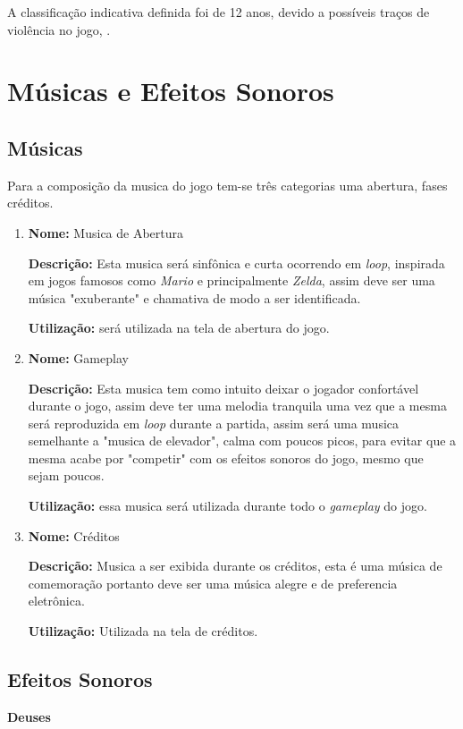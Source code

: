 \documentclass[11pt]{article} %
\begin{document}
A classificação indicativa definida foi de 12 anos, devido a possíveis traços de violência no jogo, . 


\newpage

\section{Músicas e Efeitos Sonoros}
\subsection{Músicas}
Para a composição da musica do jogo tem-se três categorias uma abertura, fases créditos. 

\begin{enumerate}
\item 
\textbf{Nome:} Musica de Abertura

\textbf{Descrição:} Esta musica será sinfônica e curta ocorrendo em \textit{loop}, inspirada em jogos famosos como \textit{Mario} e principalmente \textit{Zelda}, assim deve ser uma música "exuberante" e chamativa de modo a ser identificada.

\textbf{Utilização:} será utilizada na tela de abertura do jogo.

\item
\textbf{Nome:} Gameplay

\textbf{Descrição:} Esta musica tem como intuito deixar o jogador confortável durante o jogo, assim deve ter uma melodia tranquila uma vez que a mesma será reproduzida em \textit{loop} durante a partida, assim será uma musica semelhante a "musica de elevador", calma com poucos picos, para evitar que a mesma acabe por "competir" com os efeitos sonoros do jogo, mesmo que sejam poucos.  

\textbf{Utilização:} essa musica será utilizada durante todo o \textit{gameplay} do jogo.

\item
\textbf{Nome:} Créditos

\textbf{Descrição:} Musica a ser exibida durante os créditos, esta é uma música de comemoração portanto deve ser uma música alegre e de preferencia eletrônica. 

\textbf{Utilização:} Utilizada na tela de créditos.
\end{enumerate}

\subsection{Efeitos Sonoros}
{\LARGE \textbf{Deuses}}
\end{document}
